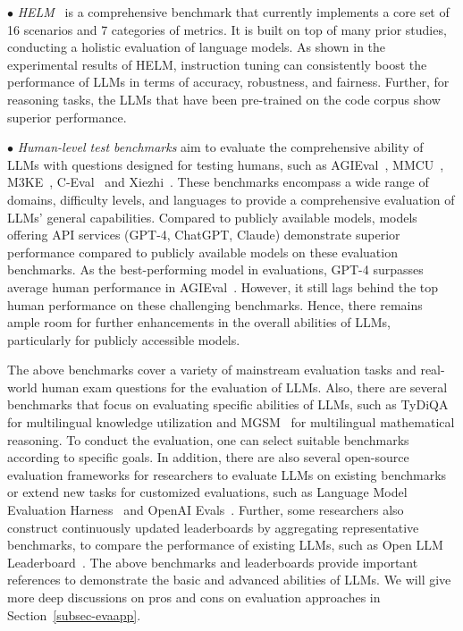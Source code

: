 $\bullet$ \emph{HELM}~\cite{Liang-arxiv-2022-Holistic} is a comprehensive benchmark that currently implements a core set of 16 scenarios and 7 categories of metrics. It is built on top of many prior studies, conducting a holistic evaluation of language models. 
As shown in the experimental results of HELM, instruction tuning can consistently boost the performance of LLMs in terms of accuracy, robustness, and fairness. Further, for reasoning tasks, the LLMs that have been pre-trained on the code corpus show superior performance.

%

$\bullet$ \emph{Human-level test benchmarks} aim to evaluate the comprehensive  ability of LLMs with questions designed for testing humans, such as AGIEval~\cite{Zhong-2023-arxiv-AGIEval}, MMCU~\cite{Zeng-arxiv-2023-MMCU}, M3KE~\cite{Liu-2023-arxiv-M3KE},  C-Eval~\cite{Huang-arxiv-2023-CEval} and {Xiezhi}~\cite{Gu-2023-arxiv-Xiezhi}.
These benchmarks encompass a wide range of domains, difficulty levels, and languages to provide a comprehensive evaluation of LLMs' general capabilities.
Compared to publicly available models, models offering API services (\eg  GPT-4, ChatGPT, Claude) demonstrate superior performance compared to publicly available models on these evaluation benchmarks.
As the best-performing model in evaluations, GPT-4 surpasses average human performance in AGIEval~\cite{Zhong-2023-arxiv-AGIEval}.
{However, it still lags behind the top human performance on these challenging benchmarks.} 
Hence, there remains ample room for further enhancements in the overall  abilities of LLMs, particularly for publicly accessible models. 

The above benchmarks cover a variety of mainstream evaluation tasks and real-world human exam questions for the evaluation of LLMs. 
Also, there are several benchmarks that focus on evaluating specific abilities of LLMs, such as TyDiQA~\cite{Clark-trans-2020-TyDi} for multilingual knowledge utilization and MGSM~\cite{Shi-arxiv-2022-Language} for multilingual mathematical reasoning. To conduct the  evaluation, one can select suitable benchmarks according to specific goals.
{In addition, there are also several open-source evaluation frameworks for researchers to evaluate LLMs on existing benchmarks or extend new tasks for customized evaluations, such as Language Model Evaluation Harness~\cite{Leo-zenodo-2021-A} and OpenAI Evals~\cite{OpenAI-OpenAI-2023-GPT-4}.}
{Further, some researchers
also construct continuously updated leaderboards by aggregating representative benchmarks, to compare the performance of existing LLMs, such as Open LLM Leaderboard~\cite{Edward-2023-hf-open}.
The above benchmarks and leaderboards provide important references to demonstrate the basic and advanced abilities of LLMs. We will give more deep discussions on pros and cons on evaluation approaches in Section~\ref{subsec-evaapp}. 
}

